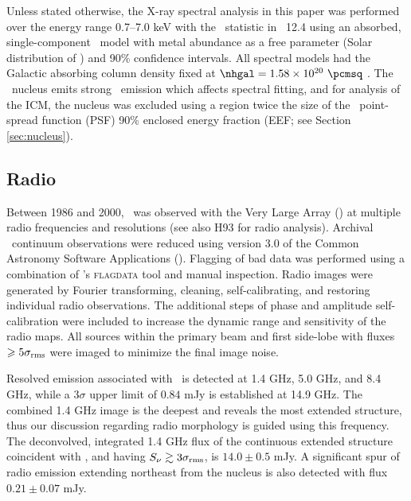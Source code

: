 \documentclass[useAMS,usenatbib]{mn2e}
\begin{document}
Unless stated otherwise, the X-ray spectral analysis in this paper was
performed over the energy range 0.7--7.0 keV with the
\chisq\ statistic in \xspec\ 12.4 \citep{xspec} using an absorbed,
single-component \mekal\ model \citep{mekal1} with metal abundance as
a free parameter (Solar distribution of \citealt{ag89}) and 90\%
confidence intervals. All spectral models had the Galactic absorbing
column density fixed at $\nhgal = 1.58 \times 10^{20} ~\pcmsq$
\citep{lab}. The \irs\ nucleus emits strong \feka\ emission which
affects spectral fitting, and for analysis of the ICM, the nucleus was
excluded using a region twice the size of the \cxo\ point-spread
function (PSF) 90\% enclosed energy fraction (EEF; see Section
\ref{sec:nucleus}).

\subsection{Radio}
\label{sec:radio}

Between 1986 and 2000, \irs\ was observed with the Very Large Array
(\vla) at multiple radio frequencies and resolutions (see also H93 for
radio analysis). Archival \vla\ continuum observations were reduced
using version 3.0 of the Common Astronomy Software Applications
(\casa). Flagging of bad data was performed using a combination of
\casa's {\textsc{flagdata}} tool and manual inspection. Radio images
were generated by Fourier transforming, cleaning, self-calibrating,
and restoring individual radio observations. The additional steps of
phase and amplitude self-calibration were included to increase the
dynamic range and sensitivity of the radio maps. All sources within
the primary beam and first side-lobe with fluxes $\ge
5\sigma_{\rm{rms}}$ were imaged to minimize the final image noise.

Resolved emission associated with \irs\ is detected at 1.4 GHz, 5.0
GHz, and 8.4 GHz, while a $3\sigma$ upper limit of $0.84$ mJy is
established at 14.9 GHz. The combined 1.4 GHz image is the deepest and
reveals the most extended structure, thus our discussion regarding
radio morphology is guided using this frequency. The deconvolved,
integrated 1.4 GHz flux of the continuous extended structure
coincident with \irs, and having $S_{\nu} \ga 3\sigma_{\rm{rms}}$, is
$14.0 \pm 0.5$ mJy. A significant spur of radio emission extending
northeast from the nucleus is also detected with flux $0.21 \pm 0.07$
mJy.
\end{document}
